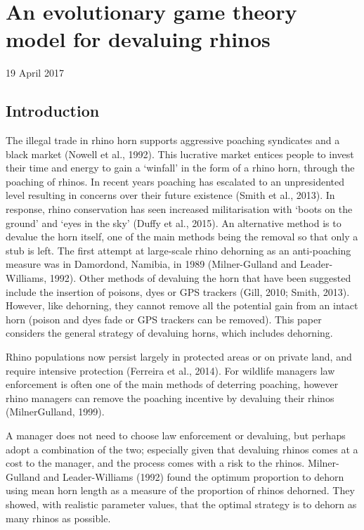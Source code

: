 \documentclass[10pt]{article}
\begin{document}
\section{An evolutionary game theory model for devaluing rhinos}
19 April 2017

\subsection{Introduction}
The illegal trade in rhino horn supports aggressive poaching
syndicates and a black market (Nowell et al., 1992). This lucrative market entices people to invest their time and energy to gain a `winfall' in the form of a rhino horn, through the poaching of rhinos. In recent years poaching has escalated to an unpresidented level resulting in concerns over their future existence (Smith et al., 2013). In response, rhino conservation has seen increased militarisation with `boots on the ground' and `eyes in the sky' (Duffy et al., 2015). An alternative method is to devalue the horn itself, one of the main methods being the removal so that only a stub is left. The first attempt at large-scale rhino dehorning as an anti-poaching measure was in Damordond, Namibia, in 1989 (Milner-Gulland and Leader-Williams, 1992). Other methods of devaluing the horn that have been suggested include the insertion of poisons, dyes or GPS trackers (Gill, 2010; Smith, 2013). However, like dehorning, they cannot remove all the potential gain from an intact horn (poison and dyes fade or GPS trackers can be removed). This paper considers the general strategy of devaluing horns, which includes dehorning.

Rhino populations now persist largely in protected areas or
on private land, and require intensive protection (Ferreira et al., 2014). For wildlife managers law enforcement is often one of the main methods of deterring poaching, however rhino managers can remove the poaching incentive by devaluing their rhinos (MilnerGulland, 1999).

A manager does not need to choose law enforcement or devaluing, but perhaps adopt a combination of the two; especially given that devaluing rhinos comes at a cost to the manager, and the process comes with a risk to the rhinos. Milner-Gulland and Leader-Williams (1992) found the optimum proportion to dehorn using mean horn length as a measure of the proportion of rhinos dehorned. They showed, with realistic parameter values, that the optimal strategy is to dehorn as many rhinos as possible.
\end{document}
